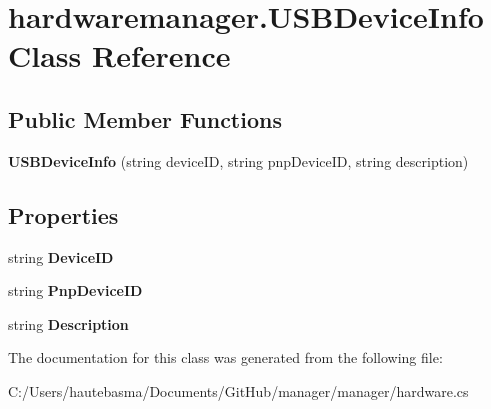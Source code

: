 \hypertarget{classhardwaremanager_1_1_u_s_b_device_info}{}\section{hardwaremanager.\+U\+S\+B\+Device\+Info Class Reference}
\label{classhardwaremanager_1_1_u_s_b_device_info}
\subsection*{Public Member Functions}
\begin{DoxyCompactItemize}
\item 
\mbox{\label{classhardwaremanager_1_1_u_s_b_device_info_a73e5b3ca58be8522b24bd5b4ed49b863}} 
{\bfseries U\+S\+B\+Device\+Info} (string device\+ID, string pnp\+Device\+ID, string description)
\end{DoxyCompactItemize}
\subsection*{Properties}
\begin{DoxyCompactItemize}
\item 
\mbox{\label{classhardwaremanager_1_1_u_s_b_device_info_a13f776f61123ca3e1ef6e460a3fad58e}} 
string {\bfseries Device\+ID}
\item 
\mbox{\label{classhardwaremanager_1_1_u_s_b_device_info_ad7794f1af882ac051fb94cb6c591e3b5}} 
string {\bfseries Pnp\+Device\+ID}
\item 
\mbox{\label{classhardwaremanager_1_1_u_s_b_device_info_a0595764544684939a5a83b73b93ba14e}} 
string {\bfseries Description}
\end{DoxyCompactItemize}


The documentation for this class was generated from the following file\+:\begin{DoxyCompactItemize}
\item 
C\+:/\+Users/hautebasma/\+Documents/\+Git\+Hub/manager/manager/hardware.\+cs\end{DoxyCompactItemize}

